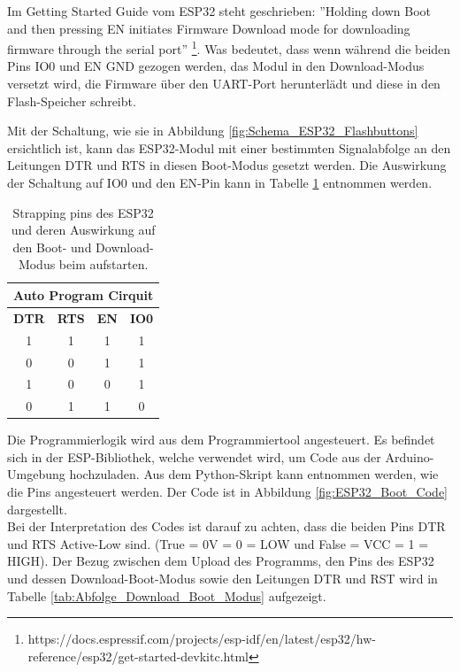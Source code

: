 Im Getting Started Guide vom ESP32 steht geschrieben: ''Holding down Boot and then pressing EN initiates Firmware Download mode for downloading firmware through the serial port'' \footnote{https://docs.espressif.com/projects/esp-idf/en/latest/esp32/hw-reference/esp32/get-started-devkitc.html}. Was bedeutet, dass wenn während die beiden Pins IO0 und EN GND gezogen werden, das Modul in den Download-Modus versetzt wird, die Firmware über den UART-Port herunterlädt und diese in den Flash-Speicher schreibt.

Mit der Schaltung, wie sie in Abbildung \ref{fig:Schema_ESP32_Flashbuttons} ersichtlich ist, kann das ESP32-Modul mit einer bestimmten Signalabfolge an den Leitungen DTR und RTS in diesen Boot-Modus gesetzt werden. Die Auswirkung der Schaltung auf IO0 und den EN-Pin kann in Tabelle \ref{tab:Einfluss_Boot_Schaltung} entnommen werden.

\begin{table}[h!]
\center
\begin{tabular}{|c|c||c|c|}
\hline
\multicolumn{4}{|c|}{\textbf{Auto Program Cirquit}}\\
\hline
\textbf{DTR} & \textbf{RTS} & \textbf{EN} & \textbf{IO0} \\
\hline
1 & 1 & 1 & 1 \\
\hline
0 & 0 & 1 & 1 \\
\hline
1 & 0 & 0 & 1 \\
\hline
0 & 1 & 1 & 0 \\
\hline
\end{tabular}

\caption{Strapping pins des ESP32 und deren Auswirkung auf den Boot- und Download-Modus beim aufstarten.}
\label{tab:Einfluss_Boot_Schaltung}
\end{table}

Die Programmierlogik wird aus dem Programmiertool angesteuert. Es befindet sich in der ESP-Bibliothek, welche verwendet wird, um Code aus der Arduino-Umgebung hochzuladen. Aus dem Python-Skript kann entnommen werden, wie die Pins angesteuert werden. Der Code ist in Abbildung \ref{fig:ESP32_Boot_Code} dargestellt.\\
Bei der Interpretation des Codes ist darauf zu achten, dass die beiden Pins DTR und RTS Active-Low sind. (True = 0V = 0 = LOW und False = VCC = 1 = HIGH). Der Bezug zwischen dem Upload des Programms, den Pins des ESP32 und dessen Download-Boot-Modus sowie den Leitungen DTR und RST wird in Tabelle \ref{tab:Abfolge_Download_Boot_Modus} aufgezeigt.


